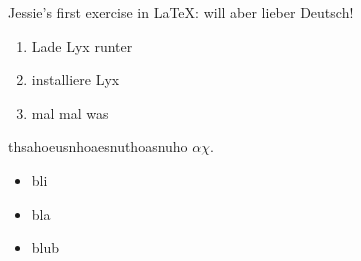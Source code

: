 \documentclass[english]{article}
\begin{document}
Jessie's first exercise in \LaTeX{}: will aber lieber Deutsch!
\begin{enumerate}
\item Lade Lyx runter
\item installiere Lyx
\item mal mal was
\end{enumerate}
thsahoeusnhoaesnuthoasnuho $\alpha\chi$.
\begin{itemize}
\item bli
\item bla
\item blub
\end{itemize}
\end{document}
